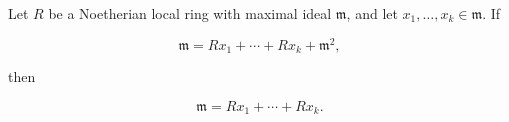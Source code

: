 Let $R$ be a Noetherian local ring with maximal ideal $\mathfrak{m}$, and let $x_1, \ldots, x_k \in \mathfrak{m}$. If

$$\mathfrak{m} = R x_1 + \cdots + R x_k + \mathfrak{m}^2,$$

then

$$\mathfrak{m} = R x_1 + \cdots + R x_k.$$
